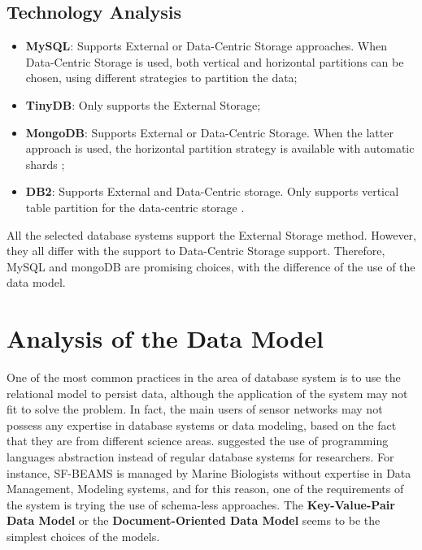 \subsection{Technology Analysis}

\begin{itemize}
  \item \textbf{MySQL}: Supports External or Data-Centric Storage approaches.
  When Data-Centric Storage is used, both vertical and horizontal partitions
  \cite{db-partitioning-relational} can be chosen, using different strategies
  to partition the data;
  \item \textbf{TinyDB}: Only supports the External Storage;
  \item \textbf{MongoDB}: Supports External or Data-Centric Storage. When the
  latter approach is used, the horizontal partition strategy is available with
  automatic shards \cite{db-mongo-partition};
  \item \textbf{DB2}: Supports External and Data-Centric storage. Only supports
  vertical table partition for the data-centric storage \cite{db-db2-partition}.
\end{itemize}

All the selected database systems support the External Storage method. However,
they all differ with the support to Data-Centric Storage support. Therefore,
MySQL and mongoDB are promising choices, with the difference of the use of the
data model.

\section{Analysis of the Data Model}

One of the most common practices in the area of database system is to use the
relational model to persist data, although the application of the system may
not fit to solve the problem. In fact, the main users of sensor networks may
not possess any expertise in database systems or data modeling, based on the
fact that they are from different science areas. \cite{sn-programming-language}
suggested the use of programming languages abstraction instead of regular
database systems for researchers. For instance, SF-BEAMS is managed by Marine
Biologists without expertise in Data Management, Modeling systems, and for
this reason, one of the requirements of the system is trying the use of
schema-less approaches. The \textbf{Key-Value-Pair Data Model} or the
\textbf{Document-Oriented Data Model} seems to be the simplest choices of the
models.

